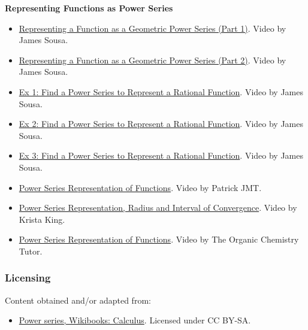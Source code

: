 \textbf{Representing Functions as Power Series}

\begin{itemize}

\item \href{https://www.youtube.com/watch?v=Sw7PcBTgE0A}{Representing a Function as a Geometric Power Series (Part 1)}. 
Video by James Sousa.

\item \href{https://www.youtube.com/watch?v=DyJetBjvT4M}{Representing a Function as a Geometric Power Series (Part 2)}. 
Video by James Sousa.

\item \href{https://www.youtube.com/watch?v=CIDaNHGcQ08}{Ex 1: Find a Power Series to Represent a Rational Function}. 
Video by James Sousa.

\item \href{https://www.youtube.com/watch?v=Ps06EgRs3tI}{Ex 2: Find a Power Series to Represent a Rational Function}. 
Video by James Sousa.

\item \href{https://www.youtube.com/watch?v=ALxAnRKG_1c}{Ex 3: Find a Power Series to Represent a Rational Function}. 
Video by James Sousa.

\item \href{https://www.youtube.com/watch?v=XWGPjZK0Yzw}{Power Series Representation of Functions}. 
Video by Patrick JMT.

\item \href{https://www.youtube.com/watch?v=wrDo-4bwB-8}{Power Series Representation, Radius and Interval of Convergence}. 
Video by Krista King.

\item \href{https://www.youtube.com/watch?v=54yldObvvwY}{Power Series Representation of Functions}. 
Video by The Organic Chemistry Tutor.

\end{itemize}

\subsubsection{Licensing}
\label{sss:lice-7352}

Content obtained and/or adapted from:

\begin{itemize}
\item \href{https://en.wikibooks.org/wiki/Calculus/Power_series}{Power series, Wikibooks: Calculus}. Licensed under CC BY-SA.
\end{itemize}


